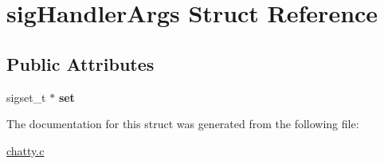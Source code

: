 \hypertarget{structsigHandlerArgs}{}\section{sig\+Handler\+Args Struct Reference}
\label{structsigHandlerArgs}
\subsection*{Public Attributes}
\begin{DoxyCompactItemize}
\item 
sigset\+\_\+t $\ast$ {\bfseries set}\hypertarget{structsigHandlerArgs_ab9003d876ac45615bcf21d0e195ea0c0}{}\label{structsigHandlerArgs_ab9003d876ac45615bcf21d0e195ea0c0}

\end{DoxyCompactItemize}


The documentation for this struct was generated from the following file\+:\begin{DoxyCompactItemize}
\item 
\hyperlink{chatty_8c}{chatty.\+c}\end{DoxyCompactItemize}
